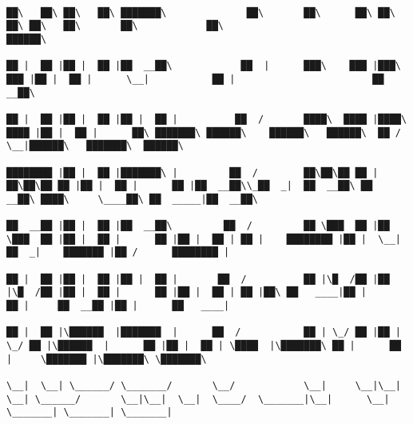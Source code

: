 \documentclass[varwidth=\maxdimen,margin=0.5cm,multi={verbatim}]{standalone}
\begin{document}
\begin{verbatim}
                                                                           ██\   ██\ ██\   ██\ ███████\              ██\       ██\      ██\ ██\      ██\ ██\   ██\       ██\            ██\                          ██████\                               
                                                                           ██ |  ██ |██ |  ██ |██  __██\            ██  |      ███\    ███ |███\    ███ |██ |  ██ |      \__|           ██ |                        ██  __██\                              
                                                                           ██ |  ██ |██ |  ██ |██ |  ██ |          ██  /       ████\  ████ |████\  ████ |██ |  ██ |      ██\ ███████\ ██████\    ██████\   ██████\  ██ /  \__|██████\   ███████\  ██████\  
                                                                           ████████ |██ |  ██ |███████\ |         ██  /        ██\██\██ ██ |██\██\██ ██ |██ |  ██ |      ██ |██  __██\\_██  _|  ██  __██\ ██  __██\ ████\     \____██\ ██  _____|██  __██\ 
                                                                           ██  __██ |██ |  ██ |██  __██\         ██  /         ██ \███  ██ |██ \███  ██ |██ |  ██ |      ██ |██ |  ██ | ██ |    ████████ |██ |  \__|██  _|    ███████ |██ /      ████████ |
                                                                           ██ |  ██ |██ |  ██ |██ |  ██ |       ██  /          ██ |\█  /██ |██ |\█  /██ |██ |  ██ |      ██ |██ |  ██ | ██ |██\ ██   ____|██ |      ██ |     ██  __██ |██ |      ██   ____|
                                                                           ██ |  ██ |\██████  |███████  |      ██  /           ██ | \_/ ██ |██ | \_/ ██ |\██████  |      ██ |██ |  ██ | \████  |\███████\ ██ |      ██ |     \███████ |\███████\ \███████\ 
                                                                           \__|  \__| \______/ \_______/       \__/            \__|     \__|\__|     \__| \______/       \__|\__|  \__|  \____/  \_______|\__|      \__|      \_______| \_______| \_______|




\end{verbatim}
\end{document}
